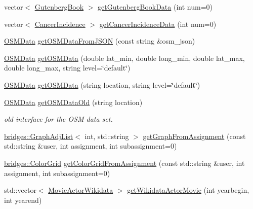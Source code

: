 \begin{DoxyCompactItemize}
\item 
vector$<$ \hyperlink{classbridges_1_1dataset_1_1_gutenberg_book}{Gutenberg\+Book} $>$ \hyperlink{classbridges_1_1_data_source_a1057509d6adf4cbfd881854adb274304}{get\+Gutenberg\+Book\+Data} (int num=0)
\item 
vector$<$ \hyperlink{classbridges_1_1dataset_1_1_cancer_incidence}{Cancer\+Incidence} $>$ \hyperlink{classbridges_1_1_data_source_a52d8161e7c093ab3615acea7085f6689}{get\+Cancer\+Incidence\+Data} (int num=0)
\item 
\hyperlink{classbridges_1_1dataset_1_1_o_s_m_data}{O\+S\+M\+Data} \hyperlink{classbridges_1_1_data_source_a1b483de1cce9921b70116213382cdaf0}{get\+O\+S\+M\+Data\+From\+J\+S\+ON} (const string \&osm\+\_\+json)
\item 
\hyperlink{classbridges_1_1dataset_1_1_o_s_m_data}{O\+S\+M\+Data} \hyperlink{classbridges_1_1_data_source_a57736934a90bdb86948a7c338ec81a2d}{get\+O\+S\+M\+Data} (double lat\+\_\+min, double long\+\_\+min, double lat\+\_\+max, double long\+\_\+max, string level=\char`\"{}default\char`\"{})
\item 
\hyperlink{classbridges_1_1dataset_1_1_o_s_m_data}{O\+S\+M\+Data} \hyperlink{classbridges_1_1_data_source_a3151f5b2a27b5d6b11e1c5cb55d51655}{get\+O\+S\+M\+Data} (string location, string level=\char`\"{}default\char`\"{})
\item 
\hyperlink{classbridges_1_1dataset_1_1_o_s_m_data}{O\+S\+M\+Data} \hyperlink{classbridges_1_1_data_source_a3ae5e11e0b70bed0498cf37b360820c2}{get\+O\+S\+M\+Data\+Old} (string location)
\begin{DoxyCompactList}\small\item\em old interface for the O\+SM data set. \end{DoxyCompactList}\item 
\hyperlink{classbridges_1_1datastructure_1_1_graph_adj_list}{bridges\+::\+Graph\+Adj\+List}$<$ int, std\+::string $>$ \hyperlink{classbridges_1_1_data_source_ac4edf55c163c60f17b13f5499e5d2e65}{get\+Graph\+From\+Assignment} (const std\+::string \&user, int assignment, int subassignment=0)
\item 
\hyperlink{classbridges_1_1datastructure_1_1_color_grid}{bridges\+::\+Color\+Grid} \hyperlink{classbridges_1_1_data_source_aa65136879011e1ec237380ef8587fea2}{get\+Color\+Grid\+From\+Assignment} (const std\+::string \&user, int assignment, int subassignment=0)
\item 
std\+::vector$<$ \hyperlink{classbridges_1_1dataset_1_1_movie_actor_wikidata}{Movie\+Actor\+Wikidata} $>$ \hyperlink{classbridges_1_1_data_source_a25b33736b4ae9ffea5fe4ebf5dbb3a63}{get\+Wikidata\+Actor\+Movie} (int yearbegin, int yearend)

\end{DoxyCompactItemize}
